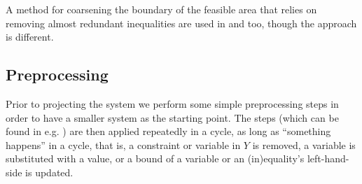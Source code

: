 A method for coarsening the boundary of the feasible area that relies on removing almost redundant inequalities are used in \cite{lukatskii08} and \cite{shapot12} too, though the approach is different.

\subsection{Preprocessing}
Prior to projecting the system we perform some simple preprocessing steps in order to have a smaller system as the starting point. The steps (which can be found in e.g. \cite{brearley75,andersen95,maros})
are then applied repeatedly in a cycle, as long as ``something happens'' in a cycle, that is, a constraint or variable in $Y$ is removed, a variable is substituted with a value, or a bound of a variable or an (in)equality's left-hand-side is updated.

